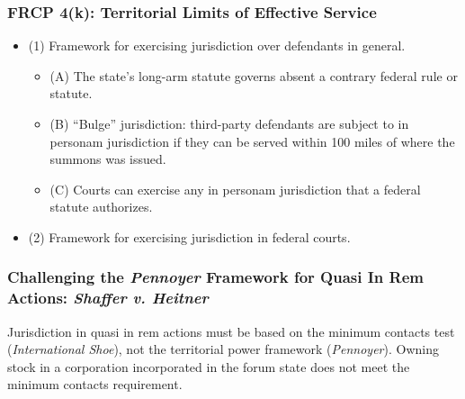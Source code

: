 \subsubsection{FRCP 4(k): Territorial Limits of Effective Service}

\begin{itemize}
    \item (1) Framework for exercising jurisdiction over defendants in 
    general.
    \begin{itemize}
        \item (A) The state's long-arm statute governs absent a contrary 
        federal rule or statute.
        \item (B) ``Bulge'' jurisdiction: third-party defendants are subject 
        to in personam jurisdiction if they can be served within 100 miles of 
        where the summons was issued.
        \item (C) Courts can exercise any in personam jurisdiction that a 
        federal statute authorizes.
    \end{itemize}
    \item (2) Framework for exercising jurisdiction in federal courts.
\end{itemize}

\subsubsection{Challenging the \emph{Pennoyer} Framework for Quasi In Rem Actions: \emph{Shaffer v.  
Heitner}}
Jurisdiction in quasi in rem actions must be based on the minimum
contacts test (\emph{International Shoe}), not the territorial power
framework (\emph{Pennoyer}). Owning stock in a corporation incorporated in the 
forum state does not meet the minimum contacts requirement.

